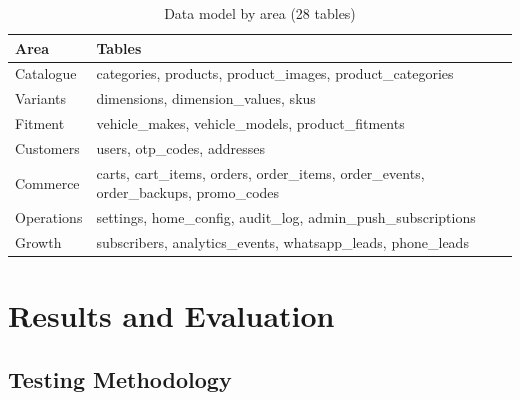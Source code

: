 \documentclass{tietreport}
\begin{document}
\begin{table}[H]
\centering\footnotesize
\begin{tabularx}{\linewidth}{l X}
\toprule
\textbf{Area} & \textbf{Tables} \\
\midrule
Catalogue & categories, products, product\_images, product\_categories \\
Variants & dimensions, dimension\_values, skus \\
Fitment & vehicle\_makes, vehicle\_models, product\_fitments \\
Customers & users, otp\_codes, addresses \\
Commerce & carts, cart\_items, orders, order\_items, order\_events, order\_backups, promo\_codes \\
Operations & settings, home\_config, audit\_log, admin\_push\_subscriptions \\
Growth & subscribers, analytics\_events, whatsapp\_leads, phone\_leads \\
\bottomrule
\end{tabularx}
\caption{Data model by area (28 tables)}
\label{tab:data}
\end{table}

\chapter{Results and Evaluation}\label{ch:results}

\section{Testing Methodology}\label{sec:testing}
\end{document}
